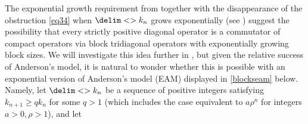 \documentclass[10pt,reqno]{amsart}
\theoremstyle{remark}
\newcommand{\seq}{\delim<>}
\numberwithin{equation}{section}
\begin{document}
The exponential growth requirement from  together with the disappearance of the obstruction \eqref{eq34} when $\seq{k_n}$ grows exponentially (see ) suggest the possibility that every strictly positive diagonal operator is a commutator of compact operators via block tridiagonal operators with exponentially growing block sizes.
We will investigate this idea further in , but given the relative success of Anderson's model, it is natural to wonder whether this is possible with an exponential version of Anderson's model (EAM) displayed in \eqref{blockseam} below.
Namely, let $\seq{k_n}$ be a sequence of positive integers satisfying $k_{n+1}\ge q k_n$ for some $q>1$ (which includes the case  equivalent to $a\rho^n$ for integers $a>0,\rho>1$), and let
\end{document}
